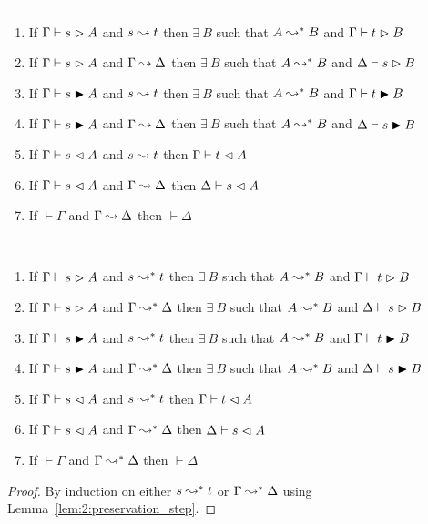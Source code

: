 \begin{lemma}
    \textcolor{white}{\_}
    \begin{enumerate}
        \item If $\Gamma \vdash s \vartriangleright A$ and $s \leadsto t$ then $\exists\ B$ such that $A \leadsto^* B$ and $\Gamma \vdash t \vartriangleright B$
        \item If $\Gamma \vdash s \vartriangleright A$ and $\Gamma \leadsto \Delta$ then $\exists\ B$ such that $A \leadsto^* B$ and $\Delta \vdash s \vartriangleright B$
        \item If $\Gamma \vdash s \blacktriangleright A$ and $s \leadsto t$ then $\exists\ B$ such that $A \leadsto^* B$ and $\Gamma \vdash t \blacktriangleright B$
        \item If $\Gamma \vdash s \blacktriangleright A$ and $\Gamma \leadsto \Delta$ then $\exists\ B$ such that $A \leadsto^* B$ and $\Delta \vdash s \blacktriangleright B$
        \item If $\Gamma \vdash s \vartriangleleft A$ and $s \leadsto t$ then $\Gamma \vdash t \vartriangleleft A$
        \item If $\Gamma \vdash s \vartriangleleft A$ and $\Gamma \leadsto \Delta$ then $\Delta \vdash s \vartriangleleft A$
        \item If $\vdash \Gamma$ and $\Gamma \leadsto \Delta$ then $\vdash \Delta$
    \end{enumerate}
    \label{lem:2:preservation_step}
\end{lemma}

\begin{theorem}[Preservation]
    \textcolor{white}{\_}
    \begin{enumerate}
        \item If $\Gamma \vdash s \vartriangleright A$ and $s \leadsto^* t$ then $\exists\ B$ such that $A \leadsto^* B$ and $\Gamma \vdash t \vartriangleright B$
        \item If $\Gamma \vdash s \vartriangleright A$ and $\Gamma \leadsto^* \Delta$ then $\exists\ B$ such that $A \leadsto^* B$ and $\Delta \vdash s \vartriangleright B$
        \item If $\Gamma \vdash s \blacktriangleright A$ and $s \leadsto^* t$ then $\exists\ B$ such that $A \leadsto^* B$ and $\Gamma \vdash t \blacktriangleright B$
        \item If $\Gamma \vdash s \blacktriangleright A$ and $\Gamma \leadsto^* \Delta$ then $\exists\ B$ such that $A \leadsto^* B$ and $\Delta \vdash s \blacktriangleright B$
        \item If $\Gamma \vdash s \vartriangleleft A$ and $s \leadsto^* t$ then $\Gamma \vdash t \vartriangleleft A$
        \item If $\Gamma \vdash s \vartriangleleft A$ and $\Gamma \leadsto^* \Delta$ then $\Delta \vdash s \vartriangleleft A$
        \item If $\vdash \Gamma$ and $\Gamma \leadsto^* \Delta$ then $\vdash \Delta$
    \end{enumerate}
    \label{thm:2:preservation}
\end{theorem}
\begin{proof}
    By induction on either $s \leadsto^* t$ or $\Gamma \leadsto^* \Delta$ using Lemma~\ref{lem:2:preservation_step}.
\end{proof}

